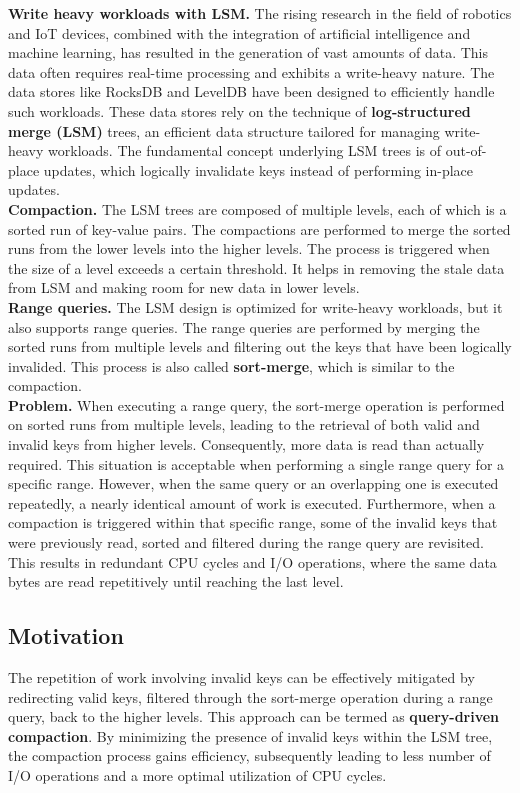 \textbf{Write heavy workloads with LSM.} The rising research in the field of robotics and IoT devices, combined with the 
integration of artificial intelligence and machine learning, has resulted in the generation of vast amounts of data.
This data often requires real-time processing and exhibits a write-heavy nature. The data stores like RocksDB and 
LevelDB have been designed to efficiently handle such workloads. These data stores rely on the technique of
\textbf{log-structured merge (LSM)} trees, an efficient data structure tailored for managing write-heavy workloads. The
fundamental concept underlying LSM trees is of out-of-place updates, which logically invalidate keys instead of 
performing in-place updates.\\
\textbf{Compaction.} The LSM trees are composed of multiple levels, each of which is a sorted run of key-value pairs. 
The compactions are performed to merge the sorted runs from the lower levels into the higher levels. The process is 
triggered when the size of a level exceeds a certain threshold. It helps in removing the stale data from LSM and 
making room for new data in lower levels.\\
\textbf{Range queries.} The LSM design is optimized for write-heavy workloads, but it also supports range queries. The
range queries are performed by merging the sorted runs from multiple levels and filtering out the keys that have been
logically invalided. This process is also called \textbf{sort-merge}, which is similar to the compaction.\\
\textbf{Problem.} When executing a range query, the sort-merge operation is performed on sorted runs from multiple 
levels, leading to the retrieval of both valid and invalid keys from higher levels. Consequently, more data is read than 
actually required. This situation is acceptable when performing a single range query for a specific range. However, when 
the same query or an overlapping one is executed repeatedly, a nearly identical amount of work is executed. Furthermore, 
when a compaction is triggered within that specific range, some of the invalid keys that were previously read, sorted 
and filtered during the range query are revisited. This results in redundant CPU cycles and I/O operations, where the 
same data bytes are read repetitively until reaching the last level.


\subsection{Motivation}
The repetition of work involving invalid keys can be effectively mitigated by redirecting valid keys, filtered through 
the sort-merge operation during a range query, back to the higher levels. This approach can be termed as 
\textbf{query-driven compaction}. By minimizing the presence of invalid keys within the LSM tree, the compaction process 
gains efficiency, subsequently leading to less number of I/O operations and a more optimal utilization of CPU cycles.


